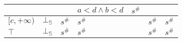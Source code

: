\documentclass{beamer}
\begin{document}
\begin{frame}
\begin{table}[]
{\begin{tabular}{|l|l|ll|ll|ll|l|}
                                        &                         &                          &                                    & $a< d \land b < d$    & $s^\#$                       &                          &                                               &                                                     \\ \hline
        $[c, +\infty)$                  & $\bot_\mathbb{S}$                  & \multicolumn{2}{l|}{$s^\#$}                                   & \multicolumn{2}{l|}{$s^\#$}                          & \multicolumn{2}{l|}{$s^\#$}                                              & $s^\#$                                              \\ \hline
        $\top$                          & $\bot_\mathbb{S}$                  & \multicolumn{2}{l|}{$s^\#$}                                   & \multicolumn{2}{l|}{$s^\#$}                          & \multicolumn{2}{l|}{$s^\#$}                                              & $s^\#$                                              \\ \hline
        \end{tabular}}
        \end{table}
    \end{frame}
    
\end{document}
